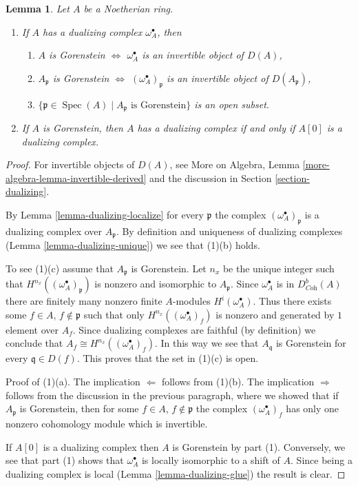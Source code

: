 \documentclass{stacks-project}
\theoremstyle{plain}
\newtheorem{lemma}[subsection]{Lemma}
\theoremstyle{definition}
\theoremstyle{remark}
\numberwithin{equation}{subsection}
\def\Spec{\mathop{\mathrm{Spec}}}
\begin{document}
\begin{lemma}
\label{lemma-gorenstein}
Let $A$ be a Noetherian ring.
\begin{enumerate}
\item If $A$ has a dualizing complex $\omega_A^\bullet$, then
\begin{enumerate}
\item $A$ is Gorenstein $\Leftrightarrow$ $\omega_A^\bullet$ is an invertible
object of $D(A)$,
\item $A_\mathfrak p$ is Gorenstein $\Leftrightarrow$
$(\omega_A^\bullet)_\mathfrak p$ is an invertible object of
$D(A_\mathfrak p)$,
\item $\{\mathfrak p \in \Spec(A) \mid A_\mathfrak p\text{ is Gorenstein}\}$
is an open subset.
\end{enumerate}
\item If $A$ is Gorenstein, then $A$ has a dualizing complex if and
only if $A[0]$ is a dualizing complex.
\end{enumerate}
\end{lemma}

\begin{proof}
For invertible objects of $D(A)$, see
More on Algebra, Lemma \ref{more-algebra-lemma-invertible-derived}
and the discussion in Section \ref{section-dualizing}.

\medskip\noindent
By Lemma \ref{lemma-dualizing-localize} for every
$\mathfrak p$ the complex $(\omega_A^\bullet)_\mathfrak p$ is a
dualizing complex over $A_\mathfrak p$. By definition and uniqueness
of dualizing complexes (Lemma \ref{lemma-dualizing-unique})
we see that (1)(b) holds.

\medskip\noindent
To see (1)(c) assume that $A_\mathfrak p$ is Gorenstein.
Let $n_x$ be the unique integer such that
$H^{n_{x}}((\omega_A^\bullet)_\mathfrak p)$
is nonzero and isomorphic to $A_\mathfrak p$.
Since $\omega_A^\bullet$ is in $D^b_{\textit{Coh}}(A)$
there are finitely many nonzero finite $A$-modules
$H^i(\omega_A^\bullet)$. Thus there exists some
$f \in A$, $f \not \in \mathfrak p$
such that only $H^{n_x}((\omega_A^\bullet)_f)$
is nonzero and generated by $1$ element over $A_f$.
Since dualizing complexes are faithful (by definition)
we conclude that $A_f \cong H^{n_x}((\omega_A^\bullet)_f)$.
In this way we see that $A_\mathfrak q$ is Gorenstein
for every $\mathfrak q \in D(f)$. This proves that the set
in (1)(c) is open.

\medskip\noindent
Proof of (1)(a). The implication $\Leftarrow$ follows from (1)(b).
The implication $\Rightarrow$ follows from the discussion
in the previous paragraph, where we showed that if $A_\mathfrak p$
is Gorenstein, then for some $f \in A$, $f \not \in \mathfrak p$
the complex $(\omega_A^\bullet)_f$ has only one nonzero cohomology module
which is invertible.

\medskip\noindent
If $A[0]$ is a dualizing complex then $A$ is Gorenstein by
part (1). Conversely, we see that part (1) shows that
$\omega_A^\bullet$ is locally isomorphic to a shift of $A$.
Since being a dualizing complex is local
(Lemma \ref{lemma-dualizing-glue})
the result is clear.
\end{proof}
\end{document}
